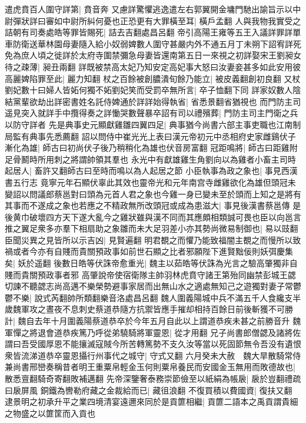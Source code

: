遣虎賁百人圍守詳第|{
	賁音奔}
又慮詳驚懼逃逸遣左右郭翼開金墉門馳出諭旨示以中尉彈狀詳曰審如中尉所糾何憂也正恐更有大罪橫至耳|{
	橫戶孟翻}
人與我物我實受之詰朝有司奏處皓等罪皆賜死|{
	詰去吉翻處昌呂翻}
帝引高陽王雍等五王入議詳罪詳單車防衛送華林園母妻隨入給小奴弱婢數人圍守甚嚴内外不通五月丁未朔下詔宥詳死免為庶人頃之徙詳於太府寺圍禁彌急母妻皆還南第五日一來視之初詳娶宋王劉昶女待之疎薄|{
	昶丑兩翻}
詳既被禁高太妃乃知安定高妃事大怒曰汝妻妾甚多如此安用彼高麗婢陷罪至此|{
	麗力知翻}
杖之百餘被創膿潰旬餘乃能立|{
	被皮義翻創初良翻}
又杖劉妃數十曰婦人皆妬何獨不妬劉妃笑而受罰卒無所言|{
	卒子恤翻下同}
詳家奴數人陰結黨輩欲劫出詳密書姓名託侍婢通於詳詳始得執省|{
	省悉景翻省猶視也}
而門防主司遥見突入就詳手中攬得奏之詳慟哭數聲暴卒詔有司以禮殯葬|{
	門防主司主門衛之兵以防守詳者}
先是典事史元顯獻雞雛四翼四足|{
	典事猶今尚書六部主事吏職也江南制局監有典事先悉薦翻}
詔以問侍中崔光光上表曰漢元帝初元中丞相府史家雌鷄伏子漸化為雄|{
	師古曰初尚伏子後乃稍稍化為雄也伏音房富翻}
冠距鳴將|{
	師古曰距雞附足骨鬭時所用刺之將謂帥領其羣也}
永光中有獻雄雞生角劉向以為雞者小畜主司時起居人|{
	畜許又翻師古曰至時而鳴以為人起居之節}
小臣執事為政之象也|{
	事見西漢書五行志}
竟寧元年石顯伏辜此其效也靈帝光和元年南宫寺雌雞欲化為雄但頭冠未變詔以問議郎蔡邕對曰頭為元首人君之象也今雞一身已變未至於頭而上知之是將有其事而不遂成之象也若應之不精政無所改頭冠或成為患滋大|{
	事見後漢書蔡邕傳}
是後黄巾破壞四方天下遂大亂今之雞狀雖與漢不同而其應頗相類誠可畏也臣以向邕言推之翼足衆多亦羣下相扇助之象雛而未大足羽差小亦其勢尚微易制御也|{
	易以豉翻}
臣聞災異之見皆所以示吉凶|{
	見賢遍翻}
明君覩之而懼乃能致福闇主覩之而慢所以致禍或者今亦有自賤而貴關預政事如前世石顯之比者邪願陛下進賢黜佞則妖弭慶集矣|{
	妖於遥翻}
後數日皓等伏誅帝愈重光|{
	魏主以茹皓等伏誅為光言之驗高肇獨非自賤而貴關預政事者邪}
高肇說帝使宿衛隊主帥羽林虎賁守諸王第殆同幽禁彭城王勰切諫不聽勰志尚高邁不樂榮勢避事家居而出無山水之適處無知己之遊獨對妻子常鬱鬱不樂|{
	說式芮翻帥所類翻樂音洛處昌呂翻}
魏人圍義陽城中兵不滿五千人食纔支半歲魏軍攻之晝夜不息刺史蔡道恭隨方抗禦皆應手摧却相持百餘日前後斬獲不可勝計|{
	魏自去年十月圍義陽蔡道恭卒於今年五月自此以上謂道恭疾未甚之前勝音升}
魏軍憚之將退會道恭疾篤乃呼從弟驍騎將軍靈恩|{
	從才用翻}
兄子尚書郎僧勰及諸將佐謂曰吾受國厚恩不能攘滅寇賊今所苦轉篤勢不支久汝等當以死固節無令吾没有遺恨衆皆流涕道恭卒靈恩攝行州事代之城守|{
	守式又翻}
六月癸未大赦　魏大旱散騎常侍兼尚書邢巒奏稱昔者明王重粟帛輕金玉何則粟帛養民而安國金玉無用而敗德故也|{
	散悉亶翻騎奇寄翻敗補邁翻}
先帝深鑒奢泰務崇節儉至以紙絹為帳扆|{
	扆於豈翻禮疏曰扆屏風}
銅鐵為轡勒府藏之金裁給而已|{
	藏徂浪翻}
不復買積以費國資|{
	復扶又翻}
逮景明之初承升平之業四境清宴遠邇來同於是貢篚相繼|{
	貢篚二語本之禹貢謂貴細之物盛之以篚筐而入貢也}
